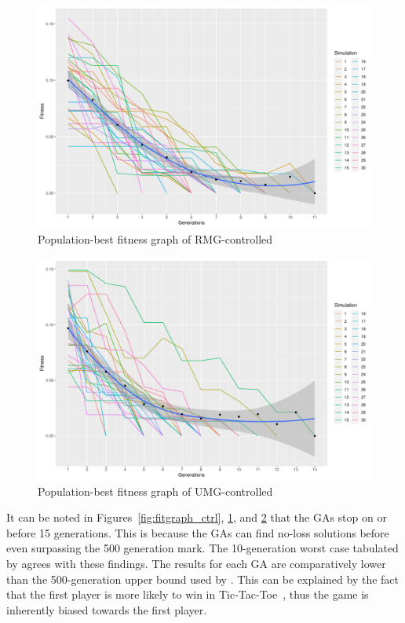 \documentclass{strrespaper-trad}
\newcommand{\ttt}{Tic-Tac-Toe}
\begin{document}
		\begin{figure}[htbp]
			\centering
			\includegraphics[width=\linewidth]{../figures/rmg_ftrack}
			\caption{Population-best fitness graph of RMG-controlled}
			\label{fig:fitgraph_rmg}
		\end{figure}
		\begin{figure}[htbp]
			\centering
			\includegraphics[width=\linewidth]{../figures/umg_ftrack}
			\caption{Population-best fitness graph of UMG-controlled}
			\label{fig:fitgraph_umg}
		\end{figure}

		It can be noted in Figures~\ref{fig:fitgraph_ctrl}, \ref{fig:fitgraph_rmg}, and \ref{fig:fitgraph_umg} that the GAs stop on or before 15 generations.
		This is because the GAs can find no-loss solutions before even surpassing the 500 generation mark.
		The 10-generation worst case tabulated by \textcite{bhattSearchNolossStrategies2008} agrees with these findings.
		The results for each GA are comparatively lower than the 500-generation upper bound used by \textcite{bhattSearchNolossStrategies2008}.
		This can be explained by the fact that the first player is more likely to win in \ttt\ \autocite{cranenburghTicTacToe2007}, thus the game is inherently biased towards the first player.
\end{document}
